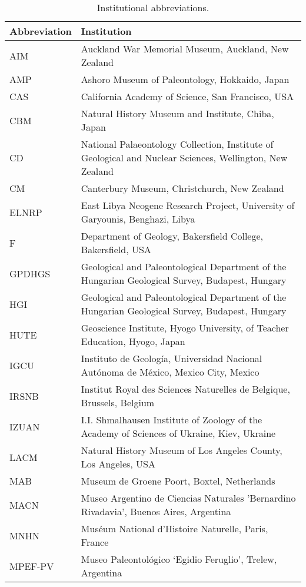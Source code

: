 \begin{longtable}{lp{}}

\caption{Institutional abbreviations.}\\

\hline
\textbf{Abbreviation} & \textbf{Institution}\\
\hline
AIM &
Auckland War Memorial Museum, Auckland, New Zealand\\
AMP &
Ashoro Museum of Paleontology, Hokkaido, Japan\\
CAS &
California Academy of Science, San Francisco, USA\\
CBM &
Natural History Museum and Institute, Chiba, Japan\\
CD &
National Palaeontology Collection, Institute of Geological and Nuclear Sciences, Wellington, New Zealand\\
CM &
Canterbury Museum, Christchurch, New Zealand\\
ELNRP & 
East Libya Neogene Research Project, University of Garyounis, Benghazi,
Libya\\
F & 
Department of Geology, Bakersfield College, Bakersfield, USA\\
GPDHGS &
Geological and Paleontological Department of the Hungarian Geological Survey, Budapest, Hungary\\
HGI &
Geological and Paleontological Department of the Hungarian Geological Survey, Budapest, Hungary\\
HUTE &
Geoscience Institute, Hyogo University, of Teacher Education, Hyogo, Japan\\
IGCU &
Instituto de Geolog\'{i}a, Universidad Nacional Aut\'{o}noma de M\'{e}xico, Mexico City, Mexico\\
IRSNB &
Institut Royal des Sciences Naturelles de Belgique, Brussels, Belgium\\
IZUAN & 
I.I. Shmalhausen Institute of Zoology of the Academy of Sciences of Ukraine, Kiev, Ukraine\\
LACM &
Natural History Museum of Los Angeles County, Los Angeles, USA\\
MAB &
Museum de Groene Poort, Boxtel, Netherlands\\
MACN &
Museo Argentino de Ciencias Naturales 'Bernardino Rivadavia', Buenos Aires, Argentina\\
MNHN &
Mus\'{e}um National d'Histoire Naturelle, Paris, France\\
MPEF-PV &
Museo Paleontol\'{o}gico `Egidio Feruglio', Trelew, Argentina\\

\end{longtable}
